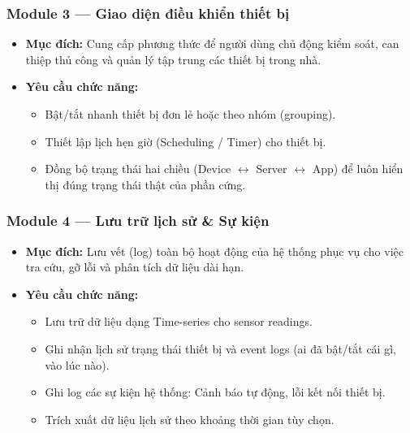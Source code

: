 \subsubsection*{Module 3 — Giao diện điều khiển thiết bị}
\begin{itemize}
  \item \textbf{Mục đích:} Cung cấp phương thức để người dùng chủ động kiểm soát, can thiệp thủ công và quản lý tập trung các thiết bị trong nhà.
  \item \textbf{Yêu cầu chức năng:}
    \begin{itemize}
      \item Bật/tắt nhanh thiết bị đơn lẻ hoặc theo nhóm (grouping).
      \item Thiết lập lịch hẹn giờ (Scheduling / Timer) cho thiết bị.
      \item Đồng bộ trạng thái hai chiều (Device $\leftrightarrow$ Server $\leftrightarrow$ App) để luôn hiển thị đúng trạng thái thật của phần cứng.
    \end{itemize}

\end{itemize}

\subsubsection*{Module 4 — Lưu trữ lịch sử \& Sự kiện}
\begin{itemize}
  \item \textbf{Mục đích:} Lưu vết (log) toàn bộ hoạt động của hệ thống phục vụ cho việc tra cứu, gỡ lỗi và phân tích dữ liệu dài hạn.
  \item \textbf{Yêu cầu chức năng:}
    \begin{itemize}
      \item Lưu trữ dữ liệu dạng Time-series cho sensor readings.
      \item Ghi nhận lịch sử trạng thái thiết bị và event logs (ai đã bật/tắt cái gì, vào lúc nào).
      \item Ghi log các sự kiện hệ thống: Cảnh báo tự động, lỗi kết nối thiết bị.
      \item Trích xuất dữ liệu lịch sử theo khoảng thời gian tùy chọn.
    \end{itemize}

\end{itemize}

